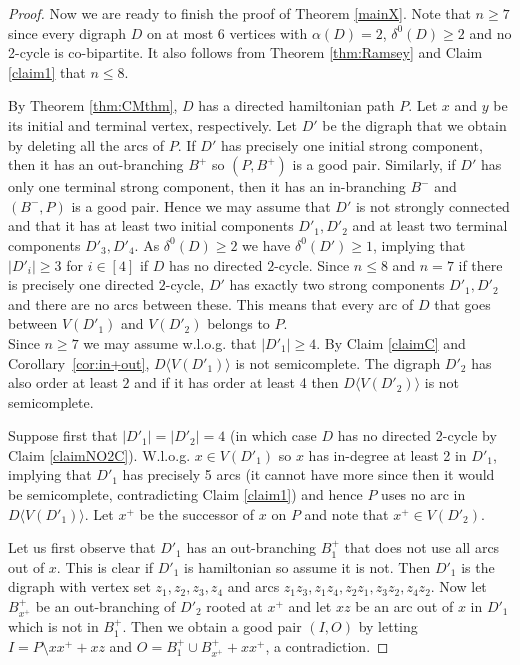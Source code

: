 \documentclass{article}
\theoremstyle{definition}
\newcommand{\2}{\vspace{0.2cm}}
\begin{document}
\begin{proof}
Now we are ready to finish the proof of Theorem \ref{mainX}.  Note
that $n\geq 7$ since every digraph $D$ on at most 6 vertices with
$\alpha{}(D)=2$, $\delta^0{}(D)\geq 2$ and no 2-cycle is co-bipartite.
It also follows from Theorem \ref{thm:Ramsey} and Claim \ref{claim1}
that $n\leq 8$.


By Theorem \ref{thm:CMthm}, $D$ has a directed hamiltonian path
$P$. Let $x$ and $y$ be its initial and terminal vertex,
respectively. Let $D'$ be the digraph that we obtain by deleting all
the arcs of $P$. If $D'$ has precisely one initial strong component,
then it has an out-branching $B^+$ so $(P,B^+)$ is a good
pair. Similarly, if $D'$ has only one terminal strong component, then
it has an in-branching $B^-$ and $(B^-,P)$ is a good pair. Hence we
may assume that $D'$ is not strongly connected and that it has at
least two initial components $D'_1,D'_2$ and at least two terminal
components $D'_3,D'_4$. As $\delta^0{}(D)\geq 2$ we have
$\delta^0{}(D')\geq 1$, implying that $|D'_i|\geq 3$ for $i\in [4]$ if
$D$ has no directed $2$-cycle. Since $n\leq 8$ and $n=7$ if there is
precisely one directed $2$-cycle, $D'$ has exactly two strong
components $D'_1,D'_2$ and there are no arcs between these. This means
that every arc of $D$ that goes between $V(D'_1)$ and $V(D'_2)$
belongs to $P$.\\

Since $n\geq 7$ we may assume w.l.o.g. that $|D'_1|\geq 4$. By Claim
\ref{claimC} and Corollary~\ref{cor:in+out}, $D\langle V(D'_1)\rangle$
is not semicomplete. The digraph $D'_2$ has also order at least $2$
and if it has order at least 4 then $D\langle V(D'_2)\rangle$ is not
semicomplete.
\medskip

Suppose first that $|D'_1|=|D'_2|=4$ (in which case $D$ has no directed 2-cycle
by Claim \ref{claimNO2C}).  W.l.o.g. $x\in V(D'_1)$ so $x$ has
in-degree at least 2 in $D'_1$, implying that $D'_1$ has precisely 5
arcs (it cannot have more since then it would be semicomplete,
contradicting Claim \ref{claim1}) and hence $P$ uses no arc in
$D\langle V(D'_1)\rangle$.  Let $x^+$ be the successor of $x$ on $P$
and note that $x^+\in V(D'_2)$.


Let us first observe that $D'_1$ has an out-branching $B^+_1$ that
does not use all arcs out of $x$. This is clear if $D'_1$ is
hamiltonian so assume it is not. Then $D'_1$ is the digraph with
vertex set $z_1,z_2,z_3,z_4$ and arcs $z_1z_3,
z_1z_4,z_2z_1,z_3z_2,z_4z_2$.  Now let $B^+_{x^+}$ be an out-branching
of $D'_2$ rooted at $x^+$ and let $xz$ be an arc out of $x$ in $D'_1$
which is not in $B^+_1$. Then we obtain a good pair $(I,O)$ by letting
$I=P\setminus xx^+ + xz$ and $O=B^+_1\cup B^+_{x^+}+xx^+$, a
contradiction.


\end{proof}
\end{document}

